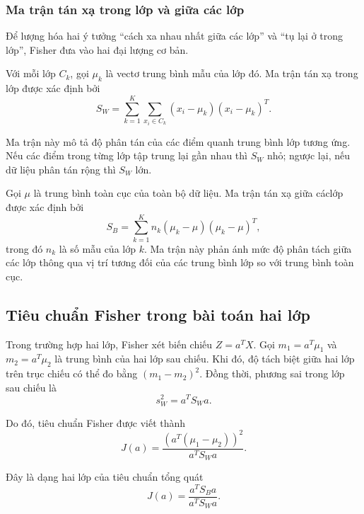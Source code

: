\subsubsection{Ma trận tán xạ trong lớp và giữa các lớp}

Để lượng hóa hai ý tưởng ``cách xa nhau nhất giữa các lớp'' và ``tụ lại ở trong lớp'', Fisher đưa vào hai đại lượng cơ bản.

Với mỗi lớp $C_{k}$, gọi $\mu_k$ là vectơ trung bình mẫu của lớp đó. Ma trận tán xạ trong lớp được xác định bởi
\begin{equation}
S_W = \sum_{k=1}^{K}\sum_{x_i \in C_k}(x_i-\mu_k)(x_i-\mu_k)^T.
\end{equation}

Ma trận này mô tả độ phân tán của các điểm quanh trung bình lớp tương ứng. Nếu các điểm trong từng lớp tập trung lại gần nhau thì $S_W$ nhỏ; ngược lại, nếu dữ liệu phân tán rộng thì $S_W$ lớn.

Gọi $\mu$ là trung bình toàn cục của toàn bộ dữ liệu. Ma trận tán xạ giữa cáclớp được xác định bởi
\begin{equation}
S_B = \sum_{k=1}^{K} n_k(\mu_k-\mu)(\mu_k-\mu)^T,
\end{equation}
trong đó $n_k$ là số mẫu của lớp $k$. Ma trận này phản ánh mức độ phân tách giữa các lớp thông qua vị trí tương đối của các trung bình lớp so với trung bình toàn cục.

\subsection{Tiêu chuẩn Fisher trong bài toán hai lớp}

Trong trường hợp hai lớp, Fisher xét biến chiếu $Z=a^T X$. Gọi $m_1=a^T\mu_1$ và $m_2=a^T\mu_2$ là trung bình của hai lớp sau chiếu. Khi đó, độ tách biệt giữa hai lớp trên trục chiếu có thể đo bằng $(m_1-m_2)^2$. Đồng thời, phương sai trong lớp sau chiếu là
\begin{equation}
s_W^2 = a^T S_W a.
\end{equation}

Do đó, tiêu chuẩn Fisher được viết thành
\begin{equation}
J(a)=\frac{(a^T(\mu_1-\mu_2))^2}{a^T S_W a}.
\end{equation}

Đây là dạng hai lớp của tiêu chuẩn tổng quát
\begin{equation}
J(a)=\frac{a^T S_B a}{a^T S_W a}.
\end{equation}

